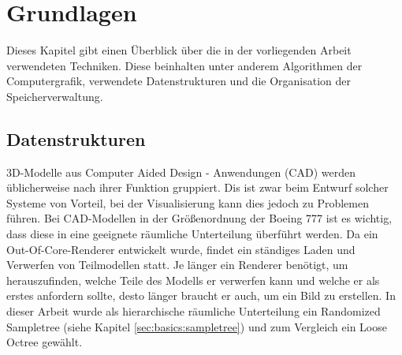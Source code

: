 \chapter{Grundlagen}
\label{chap:basics}
%
Dieses Kapitel gibt einen Überblick über die in der vorliegenden Arbeit verwendeten Techniken. Diese beinhalten unter anderem Algorithmen der Computergrafik, verwendete Datenstrukturen und die Organisation der Speicherverwaltung.

\section{Datenstrukturen}
\label{sec:basics:datenstrukturen}
3D-Modelle aus Computer Aided Design - Anwendungen (CAD) werden üblicherweise nach ihrer Funktion gruppiert. Dis ist zwar beim Entwurf solcher Systeme von Vorteil, bei der Visualisierung kann dies jedoch zu Problemen führen. Bei CAD-Modellen in der Größenordnung der Boeing 777 ist es wichtig, dass diese in eine geeignete räumliche Unterteilung überführt werden. Da ein Out-Of-Core-Renderer entwickelt wurde, findet ein ständiges Laden und Verwerfen von Teilmodellen statt. Je länger ein Renderer benötigt, um herauszufinden, welche Teile des Modells er verwerfen kann und welche er als erstes anfordern sollte, desto länger braucht er auch, um ein Bild zu erstellen. In dieser Arbeit wurde als hierarchische räumliche Unterteilung ein Randomized Sampletree (siehe Kapitel \ref{sec:basics:sampletree}) und zum Vergleich ein Loose Octree gewählt.

